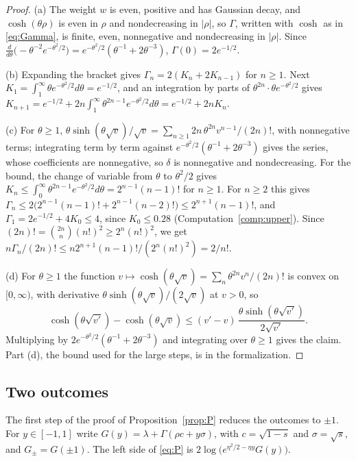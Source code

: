 \documentclass[12pt]{amsart}
\theoremstyle{definition}
\numberwithin{equation}{section}
\begin{document}
\begin{proof}
(a) The weight $w$ is even, positive and has Gaussian decay, and $\cosh(\theta\rho)$ is even in $\rho$ and nondecreasing in $|\rho|$, so $\Gamma$, written with $\cosh$ as in \eqref{eq:Gamma}, is finite, even, nonnegative and nondecreasing in $|\rho|$. Since $\frac{d}{d\theta}\bigl(-\theta^{-2}e^{-\theta^2/2}\bigr)=e^{-\theta^2/2}(\theta^{-1}+2\theta^{-3})$, $\Gamma(0)=2e^{-1/2}$.

(b) Expanding the bracket gives $\Gamma_n=2(K_n+2K_{n-1})$ for $n\ge1$. Next $K_1=\int_1^\infty\theta e^{-\theta^2/2}d\theta=e^{-1/2}$, and an integration by parts of $\theta^{2n}\cdot\theta e^{-\theta^2/2}$ gives $K_{n+1}=e^{-1/2}+2n\int_1^\infty\theta^{2n-1}e^{-\theta^2/2}d\theta=e^{-1/2}+2nK_n$.

(c) For $\theta\ge1$, $\theta\sinh(\theta\sqrt v)/\sqrt v=\sum_{n\ge1}2n\,\theta^{2n}v^{n-1}/(2n)!$, with nonnegative terms; integrating term by term against $e^{-\theta^2/2}(\theta^{-1}+2\theta^{-3})$ gives the series, whose coefficients are nonnegative, so $\delta$ is nonnegative and nondecreasing. For the bound, the change of variable from $\theta$ to $\theta^2/2$ gives $K_n\le\int_0^\infty\theta^{2n-1}e^{-\theta^2/2}d\theta=2^{n-1}(n-1)!$ for $n\ge1$. For $n\ge2$ this gives $\Gamma_n\le2\bigl(2^{n-1}(n-1)!+2^{n-1}(n-2)!\bigr)\le2^{n+1}(n-1)!$, and $\Gamma_1=2e^{-1/2}+4K_0\le4$, since $K_0\le0.28$ (Computation~\ref{comp:upper}). Since $(2n)!=\binom{2n}{n}(n!)^2\ge2^n(n!)^2$, we get $n\Gamma_n/(2n)!\le n2^{n+1}(n-1)!/(2^n(n!)^2)=2/n!$.

(d) For $\theta\ge1$ the function $v\mapsto\cosh(\theta\sqrt v)=\sum_n\theta^{2n}v^n/(2n)!$ is convex on $[0,\infty)$, with derivative $\theta\sinh(\theta\sqrt v)/(2\sqrt v)$ at $v>0$, so
\[
\cosh(\theta\sqrt{v'})-\cosh(\theta\sqrt v)\le(v'-v)\,\frac{\theta\sinh(\theta\sqrt{v'})}{2\sqrt{v'}}.
\]
Multiplying by $2e^{-\theta^2/2}(\theta^{-1}+2\theta^{-3})$ and integrating over $\theta\ge1$ gives the claim. Part (d), the bound used for the large steps, is  in the formalization.
\end{proof}

\subsection{Two outcomes}\label{subsec:two}
The first step of the proof of Proposition~\ref{prop:P} reduces the outcomes to $\pm1$. For $y\in[-1,1]$ write $G(y)=\lambda+\Gamma(\rho c+y\sigma)$, with $c=\sqrt{1-s}$ and $\sigma=\sqrt s$, and $G_\pm=G(\pm1)$. The left side of \eqref{eq:P} is $2\log\bigl(e^{\eta^2/2-\eta y}G(y)\bigr)$.
\end{document}
